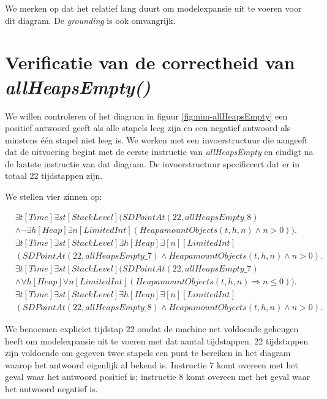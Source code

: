 We merken op dat het relatief lang duurt om modelexpansie uit te voeren voor dit diagram. De \textit{grounding} is ook omvangrijk.

\section{Verificatie van de correctheid van \textit{allHeapsEmpty()}}

We willen controleren of het diagram in figuur \ref{fig:nim-allHeapsEmpty} een positief antwoord geeft als alle stapels leeg zijn en een negatief antwoord als minstens \'e\'en stapel niet leeg is. We werken met een invoerstructuur die aangeeft dat de uitvoering begint met de eerste instructie van \textit{allHeapsEmpty} en eindigt na de laatste instructie van dat diagram. De invoerstructuur specificeert dat er in totaal 22 tijdstappen zijn.

We stellen vier zinnen op:

\begin{align}
	\nonumber&\exists{t}[Time]\exists{st}[StackLevel](SDPointAt(22, allHeapsEmpty\_8) \\ &\land \lnot\exists{h}[Heap]\exists{n}[LimitedInt](HeapamountObjects(t, h, n) \land n > 0)).\label{form:ahe_fnonempty} \\
	\nonumber&\exists{t}[Time]\exists{st}[StackLevel]\exists{h}[Heap]\exists[n][LimitedInt] \\ &(SDPointAt(22, allHeapsEmpty\_7) \land HeapamountObjects(t, h, n) \land n > 0).\label{form:ahe_fempty} \\
	\nonumber&\exists{t}[Time]\exists{st}[StackLevel](SDPointAt(22, allHeapsEmpty\_7) \\ &\land \forall{h}[Heap]\forall{n}[LimitedInt](HeapamountObjects(t, h, n) \Rightarrow n \leq 0)).\label{form:ahe_cempty} \\
	\nonumber&\exists{t}[Time]\exists{st}[StackLevel]\exists{h}[Heap]\exists[n][LimitedInt] \\ &(SDPointAt(22, allHeapsEmpty\_8) \land HeapamountObjects(t, h, n) \land n > 0).\label{form:ahe_cnonempty}
\end{align}

We benoemen expliciet tijdstap 22 omdat de machine net voldoende geheugen heeft om modelexpansie uit te voeren met dat aantal tijdstappen. 22 tijdstappen zijn voldoende om gegeven twee stapels een punt te bereiken in het diagram waarop het antwoord eigenlijk al bekend is. Instructie 7 komt overeen met het geval waar het antwoord positief is; instructie 8 komt overeen met het geval waar het antwoord negatief is.

